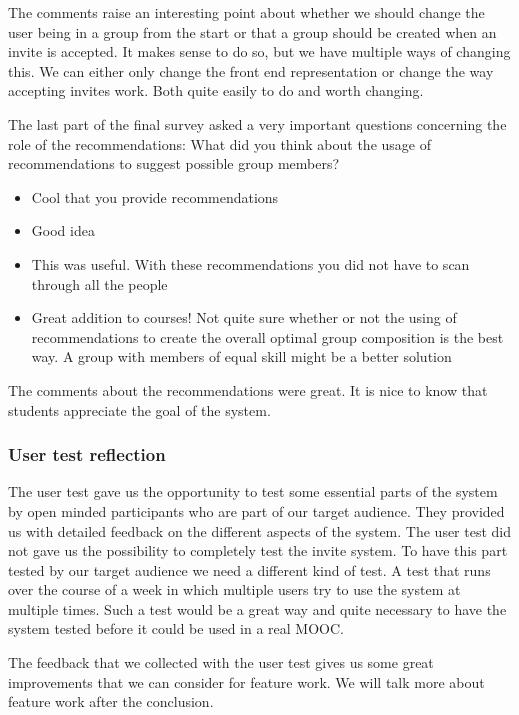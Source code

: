 The comments raise an interesting point about whether we should change the user being in a group from the start or that a group should be created when an invite is accepted.
It makes sense to do so, but we have multiple ways of changing this.
We can either only change the front end representation or change the way accepting invites work.
Both quite easily to do and worth changing.

The last part of the final survey asked a very important questions concerning the role of the recommendations:
What did you think about the usage of recommendations to suggest possible group members?\\
\begin{itemize}
\item Cool that you provide recommendations
\item Good idea
\item This was useful. With these recommendations you did not have to scan through all the people
\item Great addition to courses! Not quite sure whether or not the using of recommendations to create the overall optimal group composition is the best way. A group with members of equal skill might be a better solution
\end{itemize}
The comments about the recommendations were great.
It is nice to know that students appreciate the goal of the system.\\

\subsubsection{User test reflection}
The user test gave us the opportunity to test some essential parts of the system by open minded participants who are part of our target audience.
They provided us with detailed feedback on the different aspects of the system.
The user test did not gave us the possibility to completely test the invite system.
To have this part tested by our target audience we need a different kind of test.
A test that runs over the course of a week in which multiple users try to use the system at multiple times.
Such a test would be a great way and quite necessary to have the system tested before it could be used in a real MOOC.

The feedback that we collected with the user test gives us some great improvements that we can consider for feature work.
We will talk more about feature work after the conclusion.

